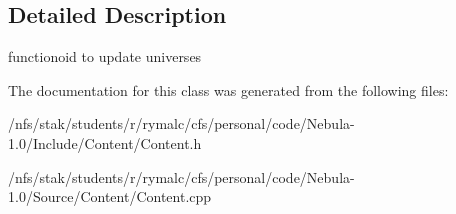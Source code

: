 \subsection{Detailed Description}
functionoid to update universes 

The documentation for this class was generated from the following files:\begin{DoxyCompactItemize}
\item 
/nfs/stak/students/r/rymalc/cfs/personal/code/Nebula-\/1.0/Include/Content/Content.h\item 
/nfs/stak/students/r/rymalc/cfs/personal/code/Nebula-\/1.0/Source/Content/Content.cpp\end{DoxyCompactItemize}

